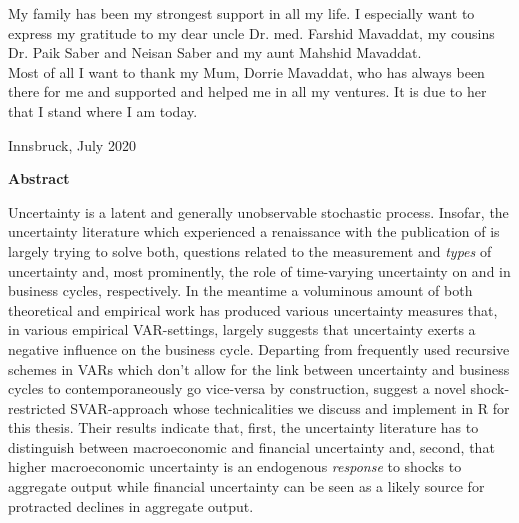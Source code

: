 \documentclass[a4paper,11pt,listof=nochaptergap,oneside,pointednumbers,bibtotoc,bigheadings,liststotoc,hidelinks]{scrbook}
\makeatletter
\theoremstyle{mysatz}
\theoremstyle{mydefinition}
\theoremstyle{mytheorem}
\theoremstyle{mybemerkung}
\newcommand\abstractname{Abstract}  %
\newenvironment{abstract}{%
      \titlepage
      \null\vfil
      \@beginparpenalty\@lowpenalty
      \begin{center}%
        \bfseries \abstractname
        \@endparpenalty\@M
      \end{center}}%
     {\par\vfil\null\endtitlepage}
\newenvironment{abstract}{%
      \if@twocolumn
        \section*{\abstractname}%
      \else
        \small
        \begin{center}%
          {\bfseries \abstractname\vspace{-.5em}\vspace{\z@}}%
        \end{center}%
        \quotation
      \fi}
      {\if@twocolumn\else\endquotation\fi}
\makeatother
\begin{document}
My family has been my strongest support in all my life. I especially want to express my gratitude to my dear uncle Dr. med. Farshid Mavaddat, my cousins Dr. Paik Saber and Neisan Saber and my aunt Mahshid Mavaddat.\\
Most of all I want to thank my Mum, Dorrie Mavaddat, who has always been there for me and supported and helped me in all my ventures. It is due to her that I stand where I am today.
    \begin{flushright}
         Innsbruck, July 2020\\
    \end{flushright}
\vspace*{\fill}
%
\pagestyle{headings}


\thispagestyle{empty} 
\begin{abstract}
Uncertainty is a latent and generally unobservable stochastic process. Insofar, the uncertainty literature which experienced a renaissance with the publication of \citet{bloom:09} is largely trying to solve both, questions related to the measurement and \textit{types} of uncertainty and, most prominently, the role of time-varying uncertainty on and in business cycles, respectively. In the meantime a voluminous amount of both theoretical and empirical work has produced various uncertainty measures that, in various empirical VAR-settings, largely suggests that uncertainty exerts a negative influence on the business cycle. Departing from frequently used recursive schemes in VARs which don't allow for the link between uncertainty and business cycles to contemporaneously go vice-versa by construction, \citep{ludvigsonetal:18, ludvigsonetal:19} suggest a novel shock-restricted SVAR-approach whose technicalities we discuss and implement in R for this thesis. Their results indicate that, first, the uncertainty literature has to distinguish between macroeconomic and financial uncertainty and, second, that higher macroeconomic uncertainty is an endogenous \textit{response} to shocks to aggregate output while financial uncertainty can be seen as a likely source for protracted declines in aggregate output.
\end{abstract}
\end{document}
